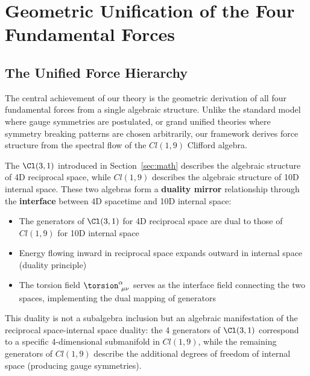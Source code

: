 \section{Geometric Unification of the Four Fundamental Forces}
\label{sec:four_forces_unified}

\subsection{The Unified Force Hierarchy}

The central achievement of our theory is the geometric derivation of all four fundamental forces from a single algebraic structure. Unlike the standard model where gauge symmetries are postulated, or grand unified theories where symmetry breaking patterns are chosen arbitrarily, our framework derives force structure from the spectral flow of the $Cl(1,9)$ Clifford algebra.

\begin{insight}
The $\Cl(3,1)$ introduced in Section~\ref{sec:math} describes the algebraic structure of 4D reciprocal space, while $Cl(1,9)$ describes the algebraic structure of 10D internal space. These two algebras form a \textbf{duality mirror} relationship through the \textbf{interface} between 4D spacetime and 10D internal space:
\begin{itemize}
    \item The generators of $\Cl(3,1)$ for 4D reciprocal space are dual to those of $Cl(1,9)$ for 10D internal space
    \item Energy flowing inward in reciprocal space expands outward in internal space (duality principle)
    \item The torsion field $\torsion^\alpha_{\ \mu\nu}$ serves as the interface field connecting the two spaces, implementing the dual mapping of generators
\end{itemize}
This duality is not a subalgebra inclusion but an algebraic manifestation of the reciprocal space-internal space duality: the 4 generators of $\Cl(3,1)$ correspond to a specific 4-dimensional submanifold in $Cl(1,9)$, while the remaining generators of $Cl(1,9)$ describe the additional degrees of freedom of internal space (producing gauge symmetries).
\end{insight}

